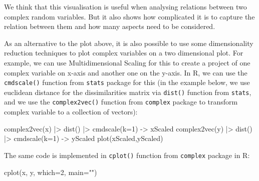\documentclass[
]{book}
\newenvironment{Shaded}{\begin{snugshade}}{\end{snugshade}}
\newcommand{\AttributeTok}[1]{\textcolor[rgb]{0.77,0.63,0.00}{#1}}
\newcommand{\DecValTok}[1]{\textcolor[rgb]{0.00,0.00,0.81}{#1}}
\newcommand{\FunctionTok}[1]{\textcolor[rgb]{0.00,0.00,0.00}{#1}}
\newcommand{\NormalTok}[1]{#1}
\newcommand{\OtherTok}[1]{\textcolor[rgb]{0.56,0.35,0.01}{#1}}
\newcommand{\SpecialCharTok}[1]{\textcolor[rgb]{0.00,0.00,0.00}{#1}}
\newcommand{\StringTok}[1]{\textcolor[rgb]{0.31,0.60,0.02}{#1}}
\begin{document}
We think that this visualisation is useful when analysing relations between two complex random variables. But it also shows how complicated it is to capture the relation between them and how many aspects need to be considered.

As an alternative to the plot above, it is also possible to use some dimensionality reduction techniques to plot complex variables on a two dimensional plot. For example, we can use Multidimensional Scaling for this \citep[MDS,][]{refMDS} to create a project of one complex variable on x-axis and another one on the y-axis. In R, we can use the \texttt{cmdscale()} function from \texttt{stats} package for this (in the example below, we use euclidean distance for the dissimilarities matrix via \texttt{dist()} function from \texttt{stats}, and we use the \texttt{complex2vec()} function from \texttt{complex} package to transform complex variable to a collection of vectors):

\begin{Shaded}
\begin{Highlighting}[]
\FunctionTok{complex2vec}\NormalTok{(x) }\SpecialCharTok{|\textgreater{}} \FunctionTok{dist}\NormalTok{() }\SpecialCharTok{|\textgreater{}} \FunctionTok{cmdscale}\NormalTok{(}\AttributeTok{k=}\DecValTok{1}\NormalTok{) }\OtherTok{{-}\textgreater{}}\NormalTok{ xScaled}
\FunctionTok{complex2vec}\NormalTok{(y) }\SpecialCharTok{|\textgreater{}} \FunctionTok{dist}\NormalTok{() }\SpecialCharTok{|\textgreater{}} \FunctionTok{cmdscale}\NormalTok{(}\AttributeTok{k=}\DecValTok{1}\NormalTok{) }\OtherTok{{-}\textgreater{}}\NormalTok{ yScaled}
\FunctionTok{plot}\NormalTok{(xScaled,yScaled)}
\end{Highlighting}
\end{Shaded}

The same code is implemented in \texttt{cplot()} function from \texttt{complex} package in R:

\begin{Shaded}
\begin{Highlighting}[]
\FunctionTok{cplot}\NormalTok{(x, y, }\AttributeTok{which=}\DecValTok{2}\NormalTok{, }\AttributeTok{main=}\StringTok{""}\NormalTok{)}
\end{Highlighting}
\end{Shaded}
\end{document}
